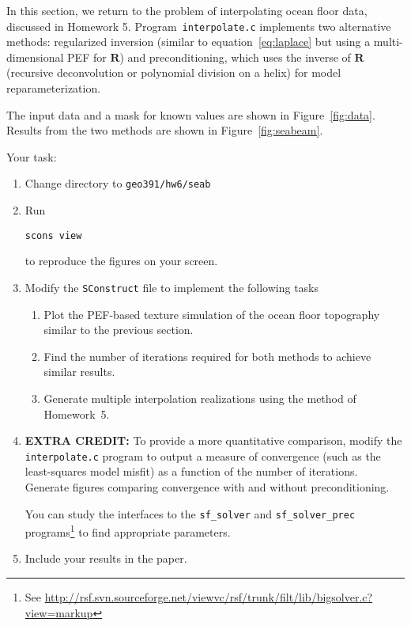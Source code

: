 In this section, we return to the problem of interpolating ocean floor
data, discussed in Homework 5. Program~\texttt{interpolate.c}
implements two alternative methods: regularized inversion (similar to
equation~\ref{eq:laplace} but using a multi-dimensional PEF for
$\mathbf{R}$) and preconditioning, which uses the inverse of
$\mathbf{R}$ (recursive deconvolution or polynomial division on a
helix) for model reparameterization.


The input data and a mask for known values are shown in
Figure~\ref{fig:data}. Results from the two methods are shown in Figure~\ref{fig:seabeam}.


\lstset{language=c,numbers=left,numberstyle=\tiny,showstringspaces=false}


\lstset{language=python,numbers=left,numberstyle=\tiny,showstringspaces=false}


Your task:
\begin{enumerate}
\item Change directory to \verb#geo391/hw6/seab#
\item Run 
\begin{verbatim}
scons view
\end{verbatim}
to reproduce the figures on your screen.
\item Modify the \texttt{SConstruct} file to implement the following tasks
\begin{enumerate}
\item Plot the PEF-based texture simulation of the ocean floor topography similar to the previous section.
\item Find the number of iterations required for both methods to achieve similar results.
\item Generate multiple interpolation realizations using the method of Homework~5.
\end{enumerate}
\item \textbf{EXTRA CREDIT:} To provide a more quantitative comparison, modify the
\texttt{interpolate.c} program to output a measure of convergence
(such as the least-squares model misfit) as a function of the number
of iterations. Generate figures comparing convergence with and without
preconditioning.

You can study the interfaces to the \texttt{sf\_solver} and
\texttt{sf\_solver\_prec} programs\footnote{See
\url{http://rsf.svn.sourceforge.net/viewvc/rsf/trunk/filt/lib/bigsolver.c?view=markup}}
to find appropriate parameters.
\item Include your results in the paper.
\end{enumerate}

